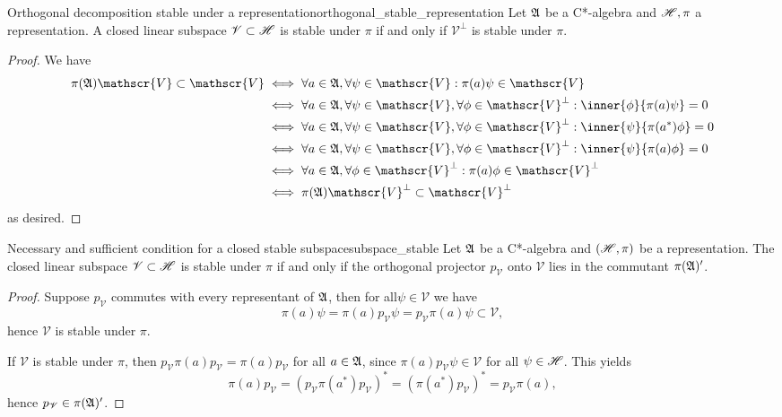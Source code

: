 \begin{proposition}{Orthogonal decomposition stable under a representation}{orthogonal_stable_representation}
    Let \(\mathfrak{A}\) be a C*-algebra and \(\mathscr{H}, \pi\) a representation. A closed linear subspace \(\mathscr{V}\subset \mathscr{H}\) is stable under \(\pi\) if and only if \(\mathscr{V}^{\perp}\) is stable under \(\pi\).
\end{proposition}
\begin{proof}
    We have
    \begin{align*}
        \pi(\algebra{A})\mathscr{V} \subset \mathscr{V}
        &\iff
        \forall a \in \algebra{A}, \forall \psi \in \mathscr{V} : \pi(a)\psi \in \mathscr{V}\\
        &\iff
        \forall a \in \algebra{A}, \forall \psi \in \mathscr{V}, \forall \phi \in \mathscr{V}^{\perp} : \inner{\phi}{\pi(a)\psi} = 0\\
        &\iff
        \forall a \in \algebra{A}, \forall \psi \in \mathscr{V}, \forall \phi \in \mathscr{V}^{\perp}: \inner{\psi}{\pi(a^*)\phi} = 0\\
        &\iff
        \forall a \in \algebra{A}, \forall \psi \in \mathscr{V}, \forall \phi \in \mathscr{V}^{\perp}: \inner{\psi}{\pi(a)\phi} = 0\\
        &\iff
        \forall a \in \algebra{A},\forall \phi \in \mathscr{V}^{\perp} : \pi(a)\phi \in \mathscr{V}^{\perp}\\
        &\iff
        \pi(\algebra{A})\mathscr{V}^{\perp} \subset \mathscr{V}^{\perp}
    \end{align*}
    as desired.
\end{proof}

\begin{proposition}{Necessary and sufficient condition for a closed stable subspace}{subspace_stable}
    Let \(\mathfrak{A}\) be a C*-algebra and \((\mathscr{H}, \pi)\) be a representation. The closed linear subspace \(\mathscr{V} \subset \mathscr{H}\) is stable under \(\pi\) if and only if the orthogonal projector \(p_{\mathscr{V}}\) onto \(\mathscr{V}\) lies in the commutant \(\pi(\mathfrak{A})'\).
\end{proposition}
\begin{proof}
    Suppose \(p_{\mathscr{V}}\) commutes with every representant of \(\mathfrak{A}\), then for all\(\psi \in \mathscr{V}\) we have
    \begin{equation*}
        \pi(a) \psi = \pi(a)p_\mathscr{V} \psi = p_{\mathscr{V}} \pi(a) \psi \subset \mathscr{V},
    \end{equation*}
    hence \(\mathscr{V}\) is stable under \(\pi\).

    If \(\mathscr{V}\) is stable under \(\pi\), then \(p_\mathscr{V} \pi(a) p_{\mathscr{V}} = \pi(a) p_{\mathscr{V}}\) for all \(a \in \mathfrak{A}\), since \(\pi(a) p_{\mathscr{V}}\psi \in \mathscr{V}\) for all \(\psi \in \mathscr{H}\). This yields
    \begin{equation*}
        \pi(a)p_{\mathscr{V}} = (p_{\mathscr{V}}\pi(a^*)p_{\mathscr{V}})^* = (\pi(a^*)p_{\mathscr{V}})^* = p_{\mathscr{V}} \pi(a),
    \end{equation*}
    hence \(p_{\mathscr{V}} \in \pi(\mathfrak{A})'\).
\end{proof}

